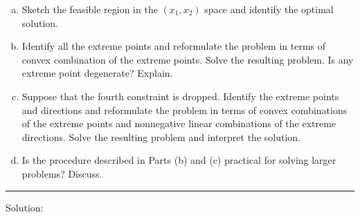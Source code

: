 \documentclass[12pt]{amsart}
\begin{document}
\begin{enumerate}[a.]
	\item 
	Sketch the feasible region in the \((x_1,x_2)\) space and identify the optimal solution.
	\item 
	Identify all the extreme points and reformulate the problem in terms of convex combination of the extreme points. 
	Solve the resulting problem. 
	Is any extreme point degenerate? Explain.
	\item 
	Suppose that the fourth constraint is dropped. Identify the extreme points and directions and reformulate the problem in terms of convex combinations of the extreme points and nonnegative linear combinations of the extreme directions. Solve the resulting problem and interpret the solution.
	\item 
	Is the procedure described in Parts (b) and (c) practical for solving larger problems? Discuss.
\end{enumerate}

\hrule \smallskip
Solution:
\end{document}
